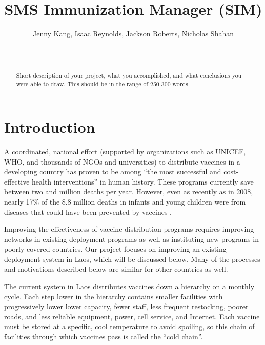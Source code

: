 \documentclass{acm_proc_article-sp}
\begin{document}
\title{SMS Immunization Manager (SIM)}

\author{
       Jenny Kang, Isaac Reynolds, Jackson Roberts, Nicholas Shahan\\
              \\
              \\
}

\maketitle
\begin{abstract}
Short description of your project, what you accomplished, and what conclusions 
you were able to draw. This should be in the range of 250-300 words.
\end{abstract}

\section{Introduction}
A coordinated, national effort (supported by organizations such as UNICEF, WHO, and thousands of NGOs and universities) to distribute vaccines in a developing country has proven to be among ``the most successful and cost-effective health interventions'' in human history. These programs currently save between two and million deaths per year. However, even as recently as in 2008, nearly 17\% of the 8.8 million deaths in infants and young children were from diseases that could have been prevented by vaccines \cite{who:campaign_essentials}. 

Improving the effectiveness of vaccine distribution programs requires improving networks in existing deployment programs as well as instituting new programs in poorly-covered countries. Our project focuses on improving an existing deployment system in Laos, which will be discussed below. Many of the processes and motivations described below are similar for other countries as well.

The current system in Laos distributes vaccines down a hierarchy on a monthly cycle. Each step lower in the hierarchy contains smaller facilities with progressively lower lower capacity, fewer staff, less frequent restocking, poorer roads, and less reliable equipment, power, cell service, and Internet. Each vaccine must be stored at a specific, cool temperature to avoid spoiling, so this chain of facilities through which vaccines pass is called the ``cold chain''.
\end{document}
